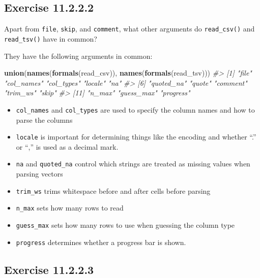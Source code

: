 \documentclass[]{book}
\newenvironment{Shaded}{\begin{snugshade}}{\end{snugshade}}
\newcommand{\CommentTok}[1]{\textcolor[rgb]{0.56,0.35,0.01}{\textit{#1}}}
\newcommand{\KeywordTok}[1]{\textcolor[rgb]{0.13,0.29,0.53}{\textbf{#1}}}
\newcommand{\NormalTok}[1]{#1}
\providecommand{\tightlist}{%
  \setlength{\itemsep}{0pt}\setlength{\parskip}{0pt}}
\theoremstyle{plain}
\theoremstyle{remark}
\begin{document}
\hypertarget{exercise-11.2.2.2}{%
\subsection*{\texorpdfstring{Exercise
{11.2.2.2}}{Exercise 11.2.2.2}}\label{exercise-11.2.2.2}}

Apart from \texttt{file}, \texttt{skip}, and \texttt{comment}, what
other arguments do \texttt{read\_csv()} and \texttt{read\_tsv()} have in
common?

They have the following arguments in common:

\begin{Shaded}
\begin{Highlighting}[]
\KeywordTok{union}\NormalTok{(}\KeywordTok{names}\NormalTok{(}\KeywordTok{formals}\NormalTok{(read_csv)), }\KeywordTok{names}\NormalTok{(}\KeywordTok{formals}\NormalTok{(read_tsv)))}
\CommentTok{#>  [1] "file"      "col_names" "col_types" "locale"    "na"       }
\CommentTok{#>  [6] "quoted_na" "quote"     "comment"   "trim_ws"   "skip"     }
\CommentTok{#> [11] "n_max"     "guess_max" "progress"}
\end{Highlighting}
\end{Shaded}

\begin{itemize}
\tightlist
\item
  \texttt{col\_names} and \texttt{col\_types} are used to specify the
  column names and how to parse the columns
\item
  \texttt{locale} is important for determining things like the encoding
  and whether ``.'' or ``,'' is used as a decimal mark.
\item
  \texttt{na} and \texttt{quoted\_na} control which strings are treated
  as missing values when parsing vectors
\item
  \texttt{trim\_ws} trims whitespace before and after cells before
  parsing
\item
  \texttt{n\_max} sets how many rows to read
\item
  \texttt{guess\_max} sets how many rows to use when guessing the column
  type
\item
  \texttt{progress} determines whether a progress bar is shown.
\end{itemize}

\hypertarget{exercise-11.2.2.3}{%
\subsection*{\texorpdfstring{Exercise
{11.2.2.3}}{Exercise 11.2.2.3}}\label{exercise-11.2.2.3}}
\end{document}

